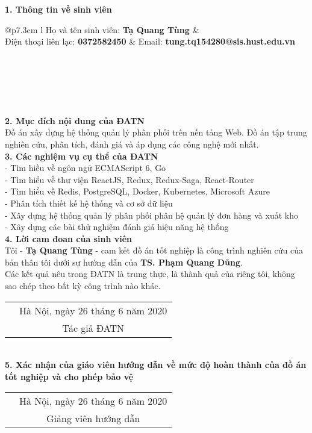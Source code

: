 \cleardoublepage

\begin{dedication}
\textbf{1. Thông tin về sinh viên} \\
\begin{tabular}{@{}p{7.3cm} l}
Họ và tên sinh viên: \textbf{Tạ Quang Tùng} & \\ 
Điện thoại liên lạc: \textbf{0372582450} &  Email: \textbf{tung.tq154280@sis.hust.edu.vn} \\
 \\
 \\
 \\
\\
\end{tabular}\\
\textbf{2. Mục đích nội dung của ĐATN}\\
Đồ án xây dựng hệ thống quản lý phân phối trên nền tảng Web. Đồ án
tập trung nghiên cứu, phân tích, đánh giá và áp dụng các công nghệ
mới nhất. \\
\textbf{3. Các nghiệm vụ cụ thể của ĐATN}\\
- Tìm hiều về ngôn ngữ ECMAScript 6, Go \\
- Tìm hiểu về thư viện ReactJS, Redux, Redux-Saga, React-Router \\
- Tìm hiểu về Redis, PostgreSQL, Docker, Kubernetes, Microsoft Azure \\
- Phân tích thiết kế hệ thống và cơ sở dữ liệu \\
- Xây dựng hệ thống quản lý phân phối phân hệ quản lý đơn hàng và xuất kho \\
- Xây dựng các bài thử nghiệm đánh giá hiệu năng hệ thống \\
\textbf{4. Lời cam đoan của sinh viên} \\
Tôi - \textbf{Tạ Quang Tùng} - cam kết đồ án tốt nghiệp
là công trình nghiên
cứu của bản thân tôi dưới sự hướng dẫn của \textbf{TS. Phạm Quang Dũng}. \\
Các kết quả nêu trong ĐATN là trung thực, là thành quả của
riêng tôi, không sao chép theo bất kỳ công trình nào khác. \\
\begin{tabu} {  m{7cm} c }
 & Hà Nội, ngày 26 tháng 6 năm 2020\\
 & Tác giả ĐATN
\end{tabu} \\[2.5cm]
\textbf{5. Xác nhận của giáo viên hướng dẫn về mức độ hoàn thành của đồ án
tốt nghiệp và cho phép bảo vệ} \\
\begin{tabu} {  m{7cm} c }
 & Hà Nội, ngày 26 tháng 6 năm 2020\\
 & Giảng viên hướng dẫn 
\end{tabu} \\[2.5cm]
\end{dedication}
